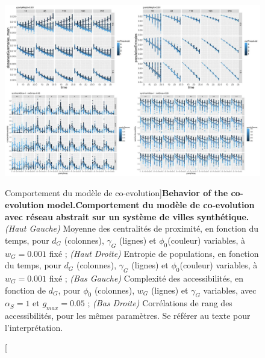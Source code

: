 \begin{figure}
\includegraphics[width=\linewidth]{Figures/Final/6-2-2-fig-macrocoevol-behavior.jpg}
\caption[Behavior of the co-evolution model][Comportement du modèle de co-evolution]{\textbf{Behavior of the co-evolution model.}\label{fig:macrocoevol:behavior}}{\textbf{Comportement du modèle de co-evolution avec réseau abstrait sur un système de villes synthétique.} \textit{(Haut Gauche)} Moyenne des centralités de proximité, en fonction du temps, pour $d_G$ (colonnes), $\gamma_G$ (lignes) et $\phi_0$(couleur) variables, à $w_G = 0.001$ fixé ; \textit{(Haut Droite)} Entropie de populations, en fonction du temps, pour $d_G$ (colonnes), $\gamma_G$ (lignes) et $\phi_0$(couleur) variables, à $w_G = 0.001$ fixé ; \textit{(Bas Gauche)} Complexité des accessibilités, en fonction de $d_G$, pour $\phi_0$ (colonnes), $w_G$ (lignes) et $\gamma_G$ variables, avec $\alpha_S = 1$ et $g_{max} = 0.05$ ; \textit{(Bas Droite)} Corrélations de rang des accessibilités, pour les mêmes paramètres. Se référer au texte pour l'interprétation.\label{fig:macrocoevol:behavior}}
\end{figure}




